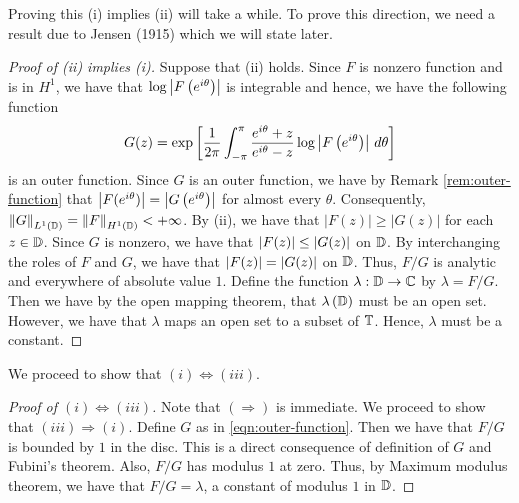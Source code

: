 Proving this (i) implies (ii) will take a while. To prove this direction, we need a result due to Jensen (1915) which we will state later.

\begin{proof}[Proof of (ii) implies (i)]
    Suppose that (ii) holds. Since $F$ is nonzero function and is in $H^{1}$, we have that $\log \left\lvert F\left( e^{i\theta} \right) \right\rvert$ is integrable and hence, we have the following function
\begin{equation}
    G(z) = \exp \left[ \frac{1}{2\pi} \int_{-\pi}^{\pi} \frac{e^{i\theta} + z}{e^{i\theta}-z} \log \left\lvert  F\left( e^{i\theta} \right) \right\rvert  \, d\theta
\right]   \label{eqn:outer-function}  \end{equation}
is an outer function. 
Since $G$ is an outer function, we have by Remark \ref{rem:outer-function} that $\left\lvert F(e^{i\theta}) \right\rvert = \left\lvert G\left( e^{i\theta} \right) \right\rvert$ for almost every $\theta$. Consequently, $\left\lVert G \right\rVert_{L^{1} \left( \mathbb D \right)} = \left\lVert F \right\rVert_{H^{1}\left( \mathbb D \right)} < +\infty$. By (ii), we have that $|F(z)| \ge |G(z)|$ for each $z\in \mathbb D$. Since $G$ is nonzero, we have that $\left\lvert F(z) \right\rvert\le \left\lvert G(z) \right\rvert$ on $\mathbb D$. By interchanging the roles of $F$ and $G$, we have that $\left\lvert F(z) \right\rvert=\left\lvert G(z) \right\rvert$ on $\mathbb D$. Thus, $F/G$ is analytic and everywhere of absolute value $1$. Define the function $\lambda : \mathbb D \to \mathbb C$ by $\lambda = F/G$. Then we have by the open mapping theorem, that $\lambda \left( \mathbb D \right)$ must be an open set. However, we have that $\lambda $ maps an open set to a subset of $\mathbb T$. Hence, $\lambda$ must be a constant.
\end{proof}

We proceed to show that $\left( i \right) \Leftrightarrow \left( iii \right)$.
\begin{proof}[Proof of $\left( i \right) \Leftrightarrow \left( iii \right)$]
    Note that $\left( \Rightarrow \right)$ is immediate. We proceed to show that $\left( iii \right) \Rightarrow \left( i \right)$. Define $G$ as in \ref{eqn:outer-function}. Then we have that $F/G$ is bounded by $1$ in the disc. This is a direct consequence of definition of $G$ and Fubini's theorem.
    Also, $F/G$ has modulus $1$ at zero. Thus, by Maximum modulus theorem, we have that $F/G=\lambda$, a constant of modulus $1$ in $\mathbb D$. 
\end{proof}

